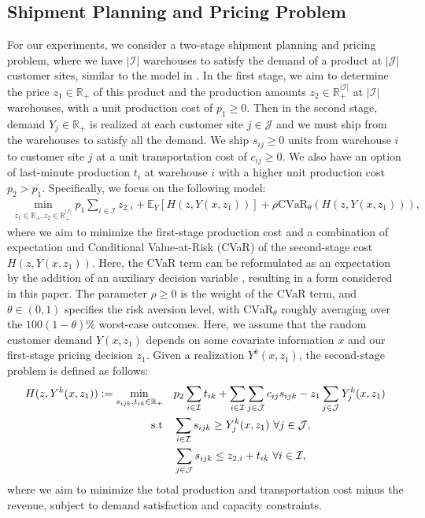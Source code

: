 \documentclass[onefignum,onetabnum]{siamart251216}
\begin{document}
\subsection{Shipment Planning and Pricing Problem}
For our experiments, we consider a two-stage shipment planning and pricing problem, where we have $|\mathcal{I}|$ warehouses to satisfy the demand of a product at $|\mathcal{J}|$ customer sites, similar to the model in \cite{bertsimas2020predictive}. In the first stage, we aim to determine the price $z_1\in\mathbb{R}_+$ of this product and the production amounts $z_2\in\mathbb{R}_+^{|\mathcal{I}|}$ at $|\mathcal{I}|$ warehouses, with a unit production cost of $p_1\ge 0$. Then in the second stage, demand $Y_j\in\mathbb{R}_+$ is realized at each customer site $j\in\mathcal{J}$ and we must ship from the warehouses to satisfy all the demand. We ship $s_{ij}\ge 0$ units from warehouse $i$ to customer site $j$ at a unit transportation cost of $c_{ij}\ge 0$. We also have an option of last-minute production $t_i$ at warehouse $i$ with a higher unit production cost $p_2>p_1$. Specifically, we focus on the following model:\vspace*{-0.05in}
\begin{align}\label{eq:cvar two stage}
    \min_{z_1\in\mathbb{R}_+,z_2 \in\mathbb{R}_+^{|\mathcal{I}|}} p_1\sum_{i\in\mathcal{I}}z_{2,i}+ \mathbb{E}_Y [H(z,Y(x,z_1))]+ \rho \text{CVaR}_\theta (H(z,Y(x,z_1))),
\end{align}
where we aim to minimize the first-stage production cost and a combination of expectation and Conditional Value-at-Risk (CVaR) of the second-stage cost $H(z,Y(x,z_1))$. Here, the CVaR term can be reformulated as an expectation by the addition of an auxiliary decision variable \cite{rockafellar2000optimization}, resulting in a form considered in this paper. The parameter $\rho\ge 0$ is the weight of the CVaR term, and $\theta\in(0,1)$ specifies the risk aversion level, with $\text{CVaR}_\theta$ roughly averaging over the $100(1-\theta)\%$ worst-case outcomes.
Here, we assume that the random customer demand $Y(x,z_1)$ depends on some covariate information $x$ and our first-stage pricing decision $z_1$. Given a realization $Y^k(x,z_1)$, the second-stage problem is defined as follows:
\begin{subequations}\label{model:pricing}
\begin{align}
    H(z,Y^k(x,z_1)):=\min_{s_{ijk},t_{ik}\in \mathbb{R}_+} \quad & p_2\sum_{i\in\mathcal{I}}t_{ik}+\sum_{i \in \mathcal{I}} \sum_{j \in \mathcal{J}} c_{ij} s_{ijk} - z_1\sum_{j \in \mathcal{J}} Y^k_{j}(x,z_1)\\
    \textrm{s.t} \quad & \sum_{i \in \mathcal{I}} s_{ijk} \ge Y^k_{j}(x,z_1)\ \forall j \in \mathcal{J},\\
    \quad & \sum_{j \in \mathcal{J}} s_{ijk} \leq z_{2,i}+t_{ik}\ \forall i \in \mathcal{I},\vspace*{-0.05in}
\end{align}
\end{subequations}
where we aim to minimize the total production and transportation cost minus the revenue, subject to demand satisfaction and capacity constraints.
\end{document}
